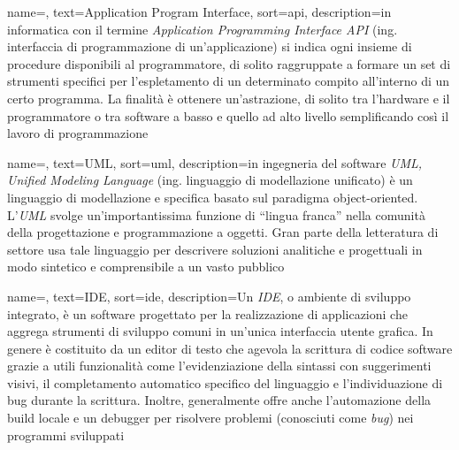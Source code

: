 



 {
    name=,
    text=Application Program Interface,
    sort=api,
    description={in informatica con il termine \emph{Application Programming Interface API} (ing. interfaccia di programmazione di un'applicazione) si indica ogni insieme di procedure disponibili al programmatore, di solito raggruppate a formare un set di strumenti specifici per l'espletamento di un determinato compito all'interno di un certo programma. La finalità è ottenere un'astrazione, di solito tra l'hardware e il programmatore o tra software a basso e quello ad alto livello semplificando così il lavoro di programmazione}
}

 {
    name=,
    text=UML,
    sort=uml,
    description={in ingegneria del software \emph{UML, Unified Modeling Language} (ing. linguaggio di modellazione unificato) è un linguaggio di modellazione e specifica basato sul paradigma object-oriented. L'\emph{UML} svolge un'importantissima funzione di ``lingua franca'' nella comunità della progettazione e programmazione a oggetti. Gran parte della letteratura di settore usa tale linguaggio per descrivere soluzioni analitiche e progettuali in modo sintetico e comprensibile a un vasto pubblico}
}

 {
    name=,
    text=IDE,
    sort=ide,
    description={Un \emph{IDE}, o ambiente di sviluppo integrato, è un software progettato per la realizzazione di applicazioni che aggrega strumenti di sviluppo comuni in un'unica interfaccia utente grafica. In genere è costituito da un editor di testo che agevola la scrittura di codice software grazie a utili funzionalità come l'evidenziazione della sintassi con suggerimenti visivi, il completamento automatico specifico del linguaggio e l'individuazione di bug durante la scrittura. Inoltre, generalmente offre anche l'automazione della build locale e un debugger per risolvere problemi (conosciuti come \emph{bug}) nei programmi sviluppati}
}

